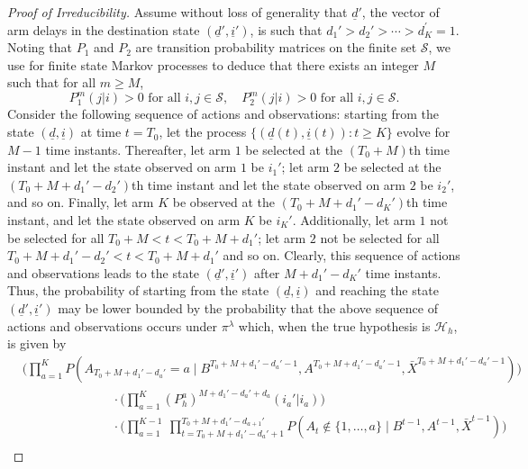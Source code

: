 \begin{proof}[Proof of Irreducibility]
Assume without loss of generality that $\underline{d}'$, the vector of arm delays in the destination state $(\underline{d}', \underline{i}')$, is such that $d_1'>d_2'>\cdots>d_K^\prime=1$. Noting that $P_1$ and $P_2$ are transition probability matrices on the finite set $\mathcal{S}$, we use \cite[Proposition 1.7]{levin2017markov} for finite state Markov processes to deduce that there exists an integer $M$ such that for all $m\geq M$,
\begin{equation}
	P_1^m(j|i)>0\text{ for all }i,j\in\mathcal{S},\quad P_2^m(j|i)>0\text{ for all }i,j\in\mathcal{S}.\label{restless_with_known_eq:P_1^M_and_P_2^M_entries_strictly_pos_entries}
\end{equation}
Consider the following sequence of actions and observations: starting from the state $(\underline{d},\underline{i})$ at time $t=T_0$, let the process $\{(\underline{d}(t), \underline{i}(t)):t \geq K\}$ evolve for $M-1$ time instants. Thereafter, let arm $1$ be selected at the $(T_0+M)$th time instant and let the state observed on arm $1$ be $i_1'$; let arm $2$ be selected at the $(T_0+M+d_1'-d_2')$th time instant and let the state observed on arm $2$ be $i_2'$, and so on. Finally, let arm $K$ be observed at the $(T_0+M+d_1'-d_K')$th time instant, and let the state observed on arm $K$ be $i_K'$. Additionally, let arm $1$ not be selected for all $T_0+M<t<T_0+M+d_1'$; let arm $2$ not be selected for all $T_0+M+d_1'-d_2'<t<T_0+M+d_1'$ and so on. Clearly, this sequence of actions and observations leads to the state $(\underline{d}',\underline{i}')$ after $M+d_1'-d_K'$ time instants. Thus, the probability of starting from the state $(\underline{d},\underline{i})$ and reaching the state $(\underline{d}',\underline{i}')$ may be lower bounded by the probability that the above sequence of actions and observations occurs under $\pi^\lambda$ which, when the true hypothesis is $\mathcal{H}_h$, is given by
\begin{align}
	&\bigg(\prod_{a=1}^{K} P(A_{T_0+M+d_1'-d_a'}=a\mid B^{T_0+M+d_1'-d_a'-1}, A^{T_0+M+d_1'-d_a'-1}, \bar{X}^{T_0+M+d_1'-d_a'-1})\bigg)\nonumber\\
	&\hspace{3cm}\cdot \bigg(\prod\limits_{a=1}^{K}(P_h^a)^{M+d_1'-d_{a}'+d_a}(i_a'|i_a)\bigg) \nonumber\\ 
	&\hspace{3cm}\cdot \bigg(\prod\limits_{a=1}^{K-1}~\prod\limits_{t=T_0+M+d_1'-d_a'+1}^{T_0+M+d_1'-d_{a+1}'}P(A_t\notin \{1,\ldots,a\}\mid B^{t-1},A^{t-1},\bar{X}^{t-1})\bigg)\nonumber\\

\end{align}
\end{proof}
